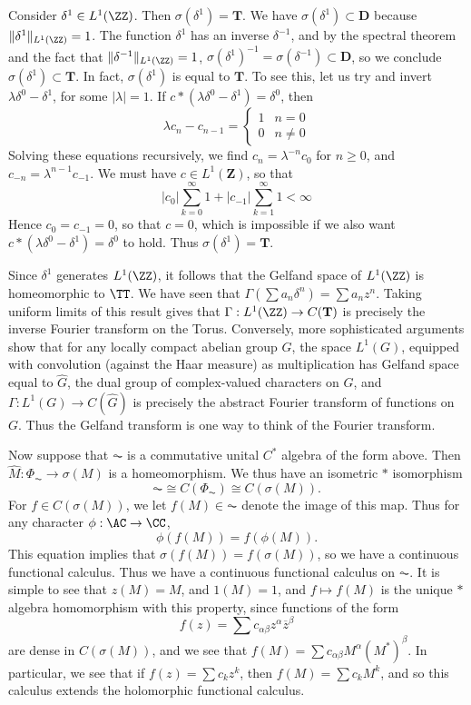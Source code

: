 \begin{example}
    Consider $\delta^1 \in L^1(\ZZ)$. Then $\sigma(\delta^1) = \mathbf{T}$. We have $\sigma(\delta^1) \subset \mathbf{D}$ because $\| \delta^1 \|_{L^1(\ZZ)} = 1$. The function $\delta^1$ has an inverse $\delta^{-1}$, and by the spectral theorem and the fact that $\| \delta^{-1} \|_{L^1(\ZZ)} = 1$, $\sigma(\delta^1)^{-1} = \sigma(\delta^{-1}) \subset \mathbf{D}$, so we conclude $\sigma(\delta^1) \subset \mathbf{T}$. In fact, $\sigma(\delta^1)$ is equal to $\mathbf{T}$. To see this, let us try and invert $\lambda \delta^0 - \delta^1$, for some $|\lambda| = 1$. If $c * (\lambda \delta^0 - \delta^1) = \delta^0$, then
    \[ \lambda c_n - c_{n-1} = \begin{cases} 1 & n = 0 \\ 0 & n \neq 0 \end{cases} \]
    Solving these equations recursively, we find $c_n = \lambda^{-n} c_0$ for $n \geq 0$, and $c_{-n} = \lambda^{n-1} c_{-1}$. We must have $c \in L^1(\mathbf{Z})$, so that
    \[ |c_0| \sum_{k = 0}^\infty 1 + |c_{-1}| \sum_{k = 1}^\infty 1 < \infty \]
    Hence $c_0 = c_{-1} = 0$, so that $c = 0$, which is impossible if we also want $c * (\lambda \delta^0 - \delta^1) = \delta^0$ to hold. Thus $\sigma(\delta^1) = \mathbf{T}$.

    Since $\delta^1$ generates $L^1(\ZZ)$, it follows that the Gelfand space of $L^1(\ZZ)$ is homeomorphic to $\TT$. We have seen that $\Gamma(\sum a_n \delta^n) = \sum a_n z^n$. Taking uniform limits of this result gives that $\Gamma: L^1(\ZZ) \to C(\mathbf{T})$ is precisely the inverse Fourier transform on the Torus. Conversely, more sophisticated arguments show that for any locally compact abelian group $G$, the space $L^1(G)$, equipped with convolution (against the Haar measure) as multiplication has Gelfand space equal to $\widehat{G}$, the dual group of complex-valued characters on $G$, and $\Gamma: L^1(G) \to C(\widehat{G})$ is precisely the abstract Fourier transform of functions on $G$. Thus the Gelfand transform is one way to think of the Fourier transform.
\end{example}

Now suppose that $\AC$ is a commutative unital $C^*$ algebra of the form above. Then $\widehat{M}: \Phi_{\AC} \to \sigma(M)$ is a homeomorphism. We thus have an isometric $*$ isomorphism
%
\[ \AC \cong C(\Phi_{\AC}) \cong C(\sigma(M)). \]
%
For $f \in C(\sigma(M))$, we let $f(M) \in \AC$ denote the image of this map. Thus for any character $\phi: \AC \to \CC$,
%
\[ \phi(f(M)) = f(\phi(M)). \]
%
This equation implies that $\sigma(f(M)) = f(\sigma(M))$, so we have a continuous functional calculus. Thus we have a continuous functional calculus on $\AC$. It is simple to see that $z(M) = M$, and $1(M) = 1$, and $f \mapsto f(M)$ is the unique $*$ algebra homomorphism with this property, since functions of the form
%
\[ f(z) = \sum c_{\alpha \beta} z^\alpha \overline{z}^\beta \]
%
are dense in $C(\sigma(M))$, and we see that $f(M) = \sum c_{\alpha \beta} M^\alpha (M^*)^\beta$. In particular, we see that if $f(z) = \sum c_k z^k$, then $f(M) = \sum c_k M^k$, and so this calculus extends the holomorphic functional calculus.

